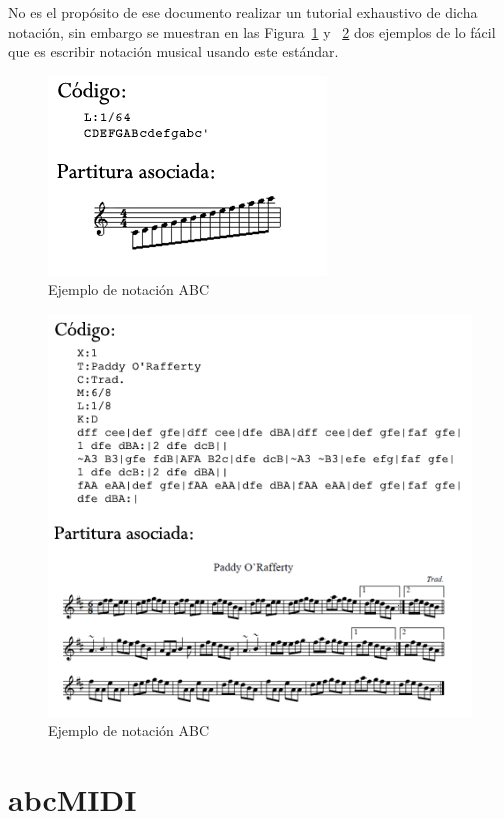 No es el propósito de ese documento realizar un tutorial exhaustivo de dicha notación, sin embargo se muestran en las Figura~\ref{fig:abcexample} y ~\ref{fig:abcexample2} dos ejemplos de lo fácil que es escribir notación musical usando este estándar.

		\begin{figure}[!htbp]
		\centering
		\includegraphics[scale=0.7]{graphics/abc-example.png}
		\caption{Ejemplo de notación ABC}
		\label{fig:abcexample}
		\end{figure}
		
		\begin{figure}[!htbp]
		\centering
		\includegraphics[scale=0.6]{graphics/abc-example2.png}
		\caption{Ejemplo de notación ABC}
		\label{fig:abcexample2}
		\end{figure}

\section{abcMIDI}
\label{sec:abcMIDI}

